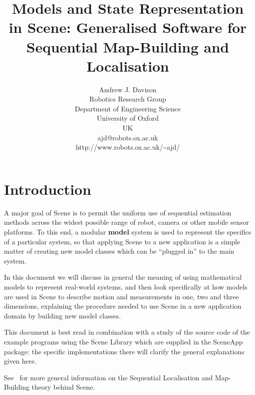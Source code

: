 \documentclass{article}
\begin{document}






\title{{Models and State Representation in Scene: Generalised Software for Sequential Map-Building and Localisation}
}

\author{Andrew J. Davison\\
Robotics Research Group\\
Department of Engineering Science\\
University of Oxford\\
UK\\
ajd@robots.ox.ac.uk\\
http://www.robots.ox.ac.uk/\~{ }ajd/
}

\maketitle


\section{Introduction}
\label{section:introduction}

A major goal of Scene is to permit the uniform use of sequential
estimation methods across the widest possible range of robot, camera
or other mobile sensor platforms. To this end, a modular {\bf model}
system is used to represent the specifics of a particular system, so
that applying Scene to a new application is a simple matter of
creating new model classes which can be ``plugged in'' to the main
system.

In this document we will discuss in general the meaning of using
mathematical models to represent real-world systems, and then look
specifically at how models are used in Scene to describe motion and
measurements in one, two and three dimensions, explaining the
procedure needed to use Scene in a new application domain by building
new model classes.

This document is best read in combination with a study of the source
code of the example programs using the Scene Library which are
supplied in the SceneApp package: the specific implementations there
will clarify the general explanations given here.

See~\cite{Davison:Kita:Smile2000} for more general information
on the Sequential Localisation and Map-Building theory behind Scene. 
\end{document}

